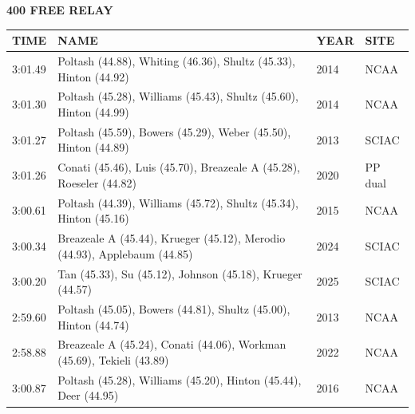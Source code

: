 \begin{table}[H]
\centering
\begin{minipage}[t]{0.6\textwidth}
\centering
\textbf{400 FREE RELAY}\\[0.1cm]
\begin{tabular}{@{}p{1.8cm}p{2.8cm}p{1.2cm}p{1.4cm}@{}}
\hline
    \textbf{TIME} & \textbf{NAME} & \textbf{YEAR} & \textbf{SITE} \\
\hline
    3:01.49 & Poltash (44.88), Whiting (46.36), Shultz (45.33), Hinton (44.92) & 2014 & NCAA \\
    3:01.30 & Poltash (45.28), Williams (45.43), Shultz (45.60), Hinton (44.99) & 2014 & NCAA \\
    3:01.27 & Poltash (45.59), Bowers (45.29), Weber (45.50), Hinton (44.89) & 2013 & SCIAC \\
    3:01.26 & Conati (45.46), Luis (45.70), Breazeale A (45.28), Roeseler (44.82) & 2020 & PP dual \\
    3:00.61 & Poltash (44.39), Williams (45.72), Shultz (45.34), Hinton (45.16) & 2015 & NCAA \\
    3:00.34 & Breazeale A (45.44), Krueger (45.12), Merodio (44.93), Applebaum (44.85) & 2024 & SCIAC \\
    3:00.20 & Tan (45.33), Su (45.12), Johnson (45.18), Krueger (44.57) & 2025 & SCIAC \\
    2:59.60 & Poltash (45.05), Bowers (44.81), Shultz (45.00), Hinton (44.74) & 2013 & NCAA \\
    2:58.88 & Breazeale A (45.24), Conati (44.06), Workman (45.69), Tekieli (43.89) & 2022 & NCAA \\
    3:00.87 & Poltash (45.28), Williams (45.20), Hinton (45.44), Deer (44.95) & 2016 & NCAA \\
\hline
\end{tabular}
\end{minipage}
\end{table}

